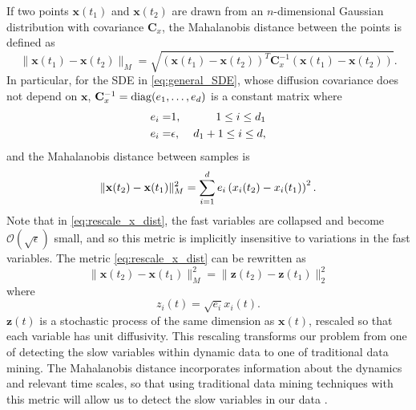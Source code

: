 If two points $\mathbf{x}(t_1)$ and $\mathbf{x}(t_2)$ are drawn from an $n$-dimensional
Gaussian distribution with covariance $\mathbf{C}_x$, the Mahalanobis distance between the points is defined as \cite{mahalanobis1936generalized}
\begin{equation}
	\| \mathbf{x}(t_1) - \mathbf{x}(t_2) \| _M = \sqrt{ (\mathbf{x}(t_1) - \mathbf{x}(t_2))^T \mathbf{C}_x^{-1} (\mathbf{x}(t_1) - \mathbf{x}(t_2) )  }.
\end{equation}
In particular,
for the SDE in \eqref{eq:general_SDE}, whose diffusion covariance does not depend on $\mathbf{x}$,  $\mathbf{C}_x^{-1} = \mathrm{diag}(e_1, \ldots, e_d)$ is a constant matrix where
\begin{equation} \label{eq:e_def}
\begin{aligned}
e_i =& 1, \: & 1 \le i \le d_1 \\
e_i =& \epsilon, \: & d_1+1 \le i \le d,
\end{aligned}
\end{equation}
and the Mahalanobis distance between samples is
\begin{equation} \label{eq:rescale_x_dist}
\| \mathbf{x}(t_2) - \mathbf{x}(t_1) \|^2_M = \sum_{i=1}^d e_i \left( x_i(t_2) - x_i(t_1) \right)^2.
\end{equation}
Note that in \eqref{eq:rescale_x_dist}, the fast variables are collapsed and become $\mathcal{O}(\sqrt{\epsilon})$ small,
and so this metric is implicitly insensitive to variations in the fast variables.
%
The metric \eqref{eq:rescale_x_dist} can be rewritten as
\begin{equation} \label{eq:norm_z}
\| \mathbf{x}(t_2) - \mathbf{x}(t_1) \|^2_M = \| \mathbf{z}(t_2) - \mathbf{z}(t_1) \|^2_2
\end{equation}
where
\begin{equation} \label{eq:general_rescale}
z_i(t) = \sqrt{e_i} x_i(t).
\end{equation}
$\mathbf{z}(t)$ is a stochastic process of the same dimension as $\mathbf{x}(t)$, rescaled so that each variable has unit diffusivity.
%
This rescaling transforms our problem from one of detecting the slow variables within dynamic data to one of traditional data mining.
%
The Mahalanobis distance incorporates information about the dynamics and relevant time scales, so that using traditional data mining techniques with this metric will allow us to detect the slow variables in our data \cite{singer2009detecting}.
